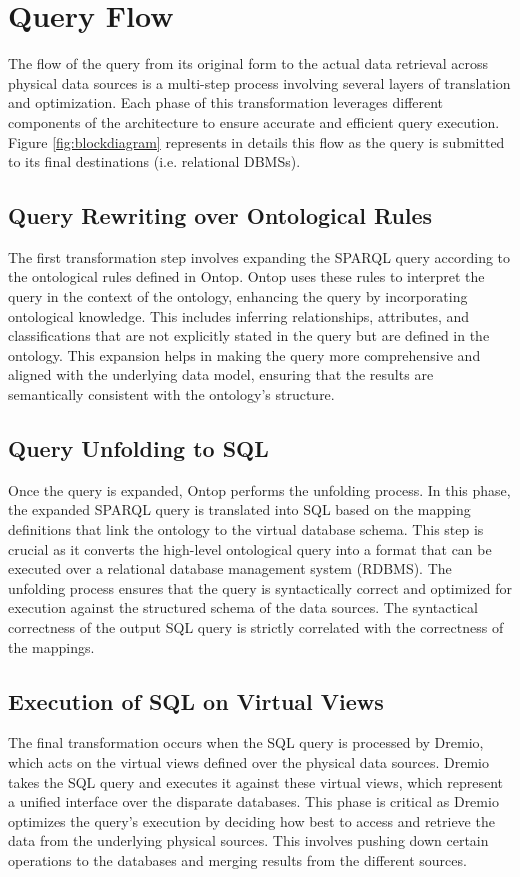 \section{Query Flow}
The flow of the query from its original form to the actual data retrieval across physical data sources is a multi-step process involving several layers of translation and optimization. Each phase of this transformation leverages different components of the architecture to ensure accurate and efficient query execution. Figure \ref{fig:blockdiagram} represents in details this flow as the query is submitted to its final destinations (i.e. relational \ac{DBMS}s).
\subsection{Query Rewriting over Ontological Rules}
The first transformation step involves expanding the \ac{SPARQL} query according to the ontological rules defined in Ontop. Ontop uses these rules to interpret the query in the context of the ontology, enhancing the query by incorporating ontological knowledge. This includes inferring relationships, attributes, and classifications that are not explicitly stated in the query but are defined in the ontology. This expansion helps in making the query more comprehensive and aligned with the underlying data model, ensuring that the results are semantically consistent with the ontology's structure.
\subsection{Query Unfolding to SQL}
Once the query is expanded, Ontop performs the unfolding process. In this phase, the expanded \ac{SPARQL} query is translated into SQL based on the mapping definitions that link the ontology to the virtual database schema. This step is crucial as it converts the high-level ontological query into a format that can be executed over a relational database management system (RDBMS). The unfolding process ensures that the query is syntactically correct and optimized for execution against the structured schema of the data sources. The syntactical correctness of the output SQL query is strictly correlated with the correctness of the mappings.
\subsection{Execution of SQL on Virtual Views}
The final transformation occurs when the SQL query is processed by Dremio, which acts on the virtual views defined over the physical data sources. Dremio takes the SQL query and executes it against these virtual views, which represent a unified interface over the disparate databases. This phase is critical as Dremio optimizes the query's execution by deciding how best to access and retrieve the data from the underlying physical sources. This involves pushing down certain operations to the databases and merging results from the different sources.


